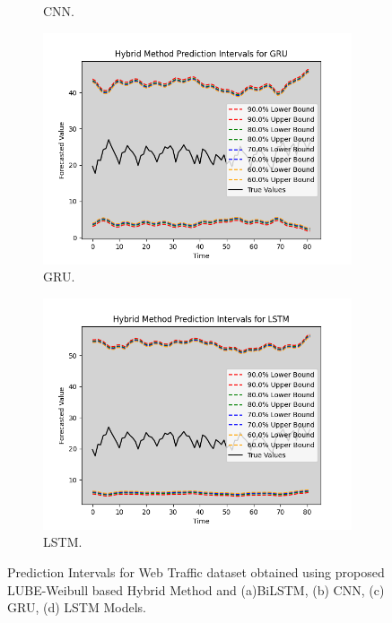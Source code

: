 \begin{figure}[H]
\begin{minipage}{0.4\textwidth}
\begin{subfigure}[b]{\textwidth}
                \caption{CNN.}
            \end{subfigure}
            \begin{subfigure}[b]{\textwidth}
                \centering
                \includegraphics[width=\textwidth]{Chap03/figs/GRU_hybrid_method_plot_Web_Traffic_Dataset_Method2.png}
                \caption{GRU.}
            \end{subfigure}
            \begin{subfigure}[b]{\textwidth}
                \centering
                \includegraphics[width=\textwidth]{Chap03/figs/LSTM_hybrid_method_plot_Web_Traffic_Dataset_Method2.png}
                \caption{LSTM.}
            \end{subfigure}
        \end{minipage}
    
    \caption{Prediction Intervals for Web Traffic dataset obtained using proposed LUBE-Weibull based Hybrid Method and (a)BiLSTM, (b) CNN, (c) GRU, (d) LSTM Models.}
    \label{F 4.5}
\end{figure}

